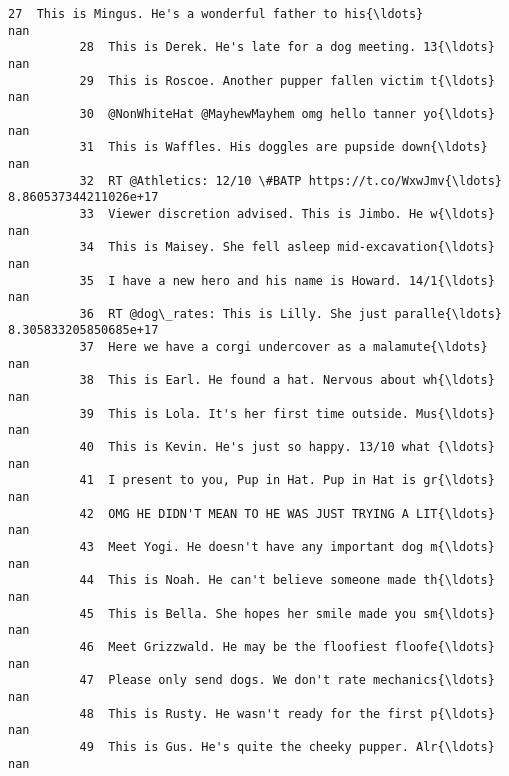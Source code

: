 \documentclass[11pt]{article}
\begin{document}
\begin{Verbatim}[commandchars=\\\{\}]
          27  This is Mingus. He's a wonderful father to his{\ldots}                    nan   
          28  This is Derek. He's late for a dog meeting. 13{\ldots}                    nan   
          29  This is Roscoe. Another pupper fallen victim t{\ldots}                    nan   
          30  @NonWhiteHat @MayhewMayhem omg hello tanner yo{\ldots}                    nan   
          31  This is Waffles. His doggles are pupside down{\ldots}                    nan   
          32  RT @Athletics: 12/10 \#BATP https://t.co/WxwJmv{\ldots}  8.860537344211026e+17   
          33  Viewer discretion advised. This is Jimbo. He w{\ldots}                    nan   
          34  This is Maisey. She fell asleep mid-excavation{\ldots}                    nan   
          35  I have a new hero and his name is Howard. 14/1{\ldots}                    nan   
          36  RT @dog\_rates: This is Lilly. She just paralle{\ldots}  8.305833205850685e+17   
          37  Here we have a corgi undercover as a malamute{\ldots}                    nan   
          38  This is Earl. He found a hat. Nervous about wh{\ldots}                    nan   
          39  This is Lola. It's her first time outside. Mus{\ldots}                    nan   
          40  This is Kevin. He's just so happy. 13/10 what {\ldots}                    nan   
          41  I present to you, Pup in Hat. Pup in Hat is gr{\ldots}                    nan   
          42  OMG HE DIDN'T MEAN TO HE WAS JUST TRYING A LIT{\ldots}                    nan   
          43  Meet Yogi. He doesn't have any important dog m{\ldots}                    nan   
          44  This is Noah. He can't believe someone made th{\ldots}                    nan   
          45  This is Bella. She hopes her smile made you sm{\ldots}                    nan   
          46  Meet Grizzwald. He may be the floofiest floofe{\ldots}                    nan   
          47  Please only send dogs. We don't rate mechanics{\ldots}                    nan   
          48  This is Rusty. He wasn't ready for the first p{\ldots}                    nan   
          49  This is Gus. He's quite the cheeky pupper. Alr{\ldots}                    nan   
          

\end{Verbatim}
\end{document}
